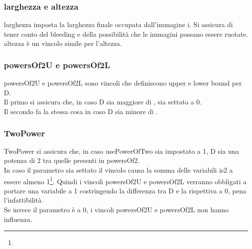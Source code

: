 \subsubsection{larghezza e altezza}
larghezza imposta la larghezza finale occupata dall'immagine i. Si assicura di tener conto del bleeding e della possibilità che le immagini possano essere ruotate. \\
altezza è un vincolo simile per l'altezza.


\subsubsection{powersOf2U e powersOf2L}
powersOf2U e powersOf2L sono vincoli che definiscono upper e lower bound per D. \\
Il primo si assicura che, in caso D sia maggiore di \powersOfTp{}, \isTp{} sia settato a 0. \\
Il secondo fa la stessa cosa in caso D sia minore di \powersOfTp. 

\subsubsection{TwoPower}
TwoPower si assicura che, in caso usePowerOfTwo sia impostato a 1, D sia una potenza di 2 tra quelle presenti in powersOf2. \\
In caso il parametro sia settato il vincolo causa la somma delle variabili is2 a essere almeno 1\footnote{\footIsTSum}.
Quindi i vincoli powersOf2U e powersOf2L verranno obbligati a portare una variabile \isTp{} a 1 costringendo la differenza tra D e la rispettiva \powersOfTp{} a 0, pena l'infattibilità. \\
Se invece il parametro è a 0, i vincoli powersOf2U e powersOf2L non hanno influenza.



\newpage
